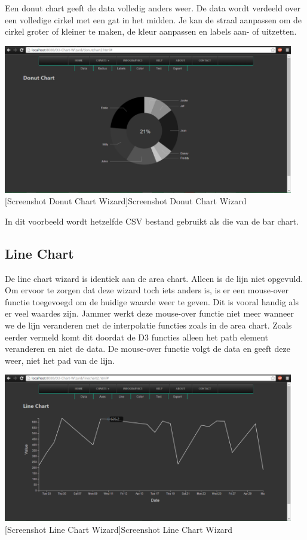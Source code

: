 Een donut chart geeft de data volledig anders weer. De data wordt verdeeld over een volledige cirkel met een gat in het midden. Je kan de straal aanpassen om de cirkel groter of kleiner te maken, de kleur aanpassen en labels aan- of uitzetten.
\begin{center}
  \includegraphics[width=0.95\textwidth]{figures/chap2/donutchart.png}
  [Screenshot Donut Chart Wizard]{Screenshot Donut Chart Wizard
\label{fig_donutchart}}
\end{center}

In dit voorbeeld wordt hetzelfde CSV bestand gebruikt als die van de bar chart.
\subsection{Line Chart}

De line chart wizard is identiek aan de area chart. Alleen is de lijn niet opgevuld. Om ervoor te zorgen dat deze wizard toch iets anders is, is er een mouse-over functie toegevoegd om de huidige waarde weer te geven. Dit is vooral handig als er veel waardes zijn. Jammer werkt deze mouse-over functie niet meer wanneer we de lijn veranderen met de interpolatie functies zoals in de area chart. Zoals eerder vermeld komt dit doordat de D3 functies alleen het path element veranderen en niet de data. De mouse-over functie volgt de data en geeft deze weer, niet het pad van de lijn.

\begin{center}
  \includegraphics[width=0.95\textwidth]{figures/chap2/linechart.png}
  [Screenshot Line Chart Wizard]{Screenshot Line Chart Wizard
\label{fig_linechart}}
\end{center}

